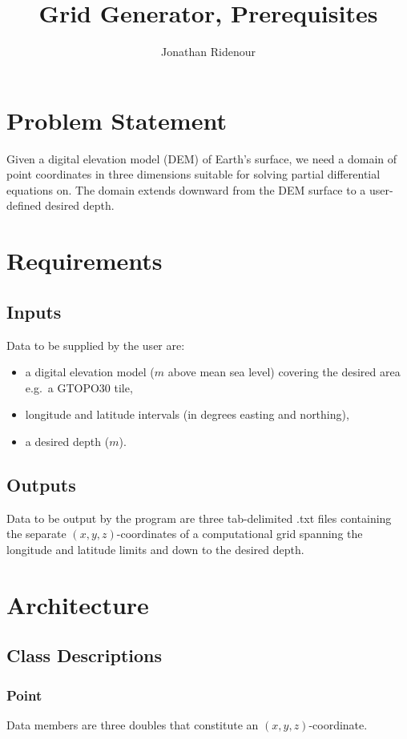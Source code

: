 \documentclass{article}
\title{Grid Generator, Prerequisites\\
}
\author{Jonathan Ridenour}
\begin{document}
\maketitle

\section{Problem Statement}
Given a digital elevation model (DEM) of Earth's surface, we need a domain of point coordinates in three dimensions suitable for solving partial differential equations on. The domain extends downward from the DEM surface to a user-defined desired depth.

\section{Requirements}

\subsection{Inputs}
Data to be supplied by the user are: 
\begin{itemize}
\item a digital elevation model ($m$ above mean sea level) covering the desired area e.g.\ a GTOPO30 tile, 
\item longitude and latitude intervals (in degrees easting and northing),
\item a desired depth ($m$).
\end{itemize}

\subsection{Outputs}
Data to be output by the program are three tab-delimited .txt files containing the separate $(x, y, z)$-coordinates of a computational grid spanning the longitude and latitude limits and down to the desired depth.

\section{Architecture}

\subsection{Class Descriptions}

\subsubsection{Point}
Data members are three doubles that constitute an $(x,y,z)$-coordinate. 
\end{document}
